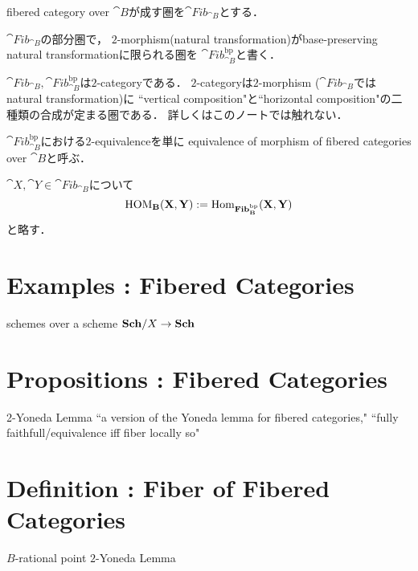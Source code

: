 \documentclass[a4paper, dvipdfmx]{jsarticle}
\newcommand{\Fib}{\cat{Fib}}
\newcommand{\FibBP}{\cat{Fib}^{\mathrm{bp}}}
\newcommand{\HOM}{\operatorname{HOM}}
\begin{document}
\begin{Def}
\begin{myenum}
\item
    fibered category over $\cat{B}$が成す圏を$\Fib_{\cat{B}}$とする．
\item
    $\Fib_{\cat{B}}$の部分圏で，
    $2$-morphism(natural transformation)がbase-preserving natural transformationに限られる圏を
    $\FibBP_{\cat{B}}$と書く．
\end{myenum}
\end{Def}

\begin{Remark}
    $\Fib_{\cat{B}}, \FibBP_{\cat{B}}$は$2$-categoryである．
    $2$-categoryは$2$-morphism ($\Fib_{\cat{B}}$ではnatural transformation)に
    ``vertical composition"と``horizontal composition"の二種類の合成が定まる圏である．
    詳しくはこのノートでは触れない．
\end{Remark}

\begin{Def}[Equivalence, $\HOM$]
\begin{myenum}
\item
    $\FibBP_{\cat{B}}$における$2$-equivalenceを単に
    equivalence of morphism of fibered categories over $\cat{B}$と呼ぶ．
\item
    $\cat{X}, \cat{Y} \in \Fib_{\cat{B}}$について
    \[ \HOM_{\cat{B}}(\cat{X}, \cat{Y}):=\Hom_{\FibBP_{\cat{B}}}(\cat{X}, \cat{Y}) \]
    と略す．
\end{myenum}
\end{Def}

\section{Examples : Fibered Categories}
schemes over a scheme
$\mathbf{Sch}/X \to \mathbf{Sch}$

\section{Propositions : Fibered Categories}
2-Yoneda Lemma
``a version of the Yoneda lemma for fibered categories,"
``fully faithfull/equivalence iff fiber locally so"

\section{Definition : Fiber of Fibered Categories}
\begin{Def}[Fiber]
\end{Def}
\begin{Remark}
    $B$-rational point
    $2$-Yoneda Lemma
\end{Remark}
\end{document}
